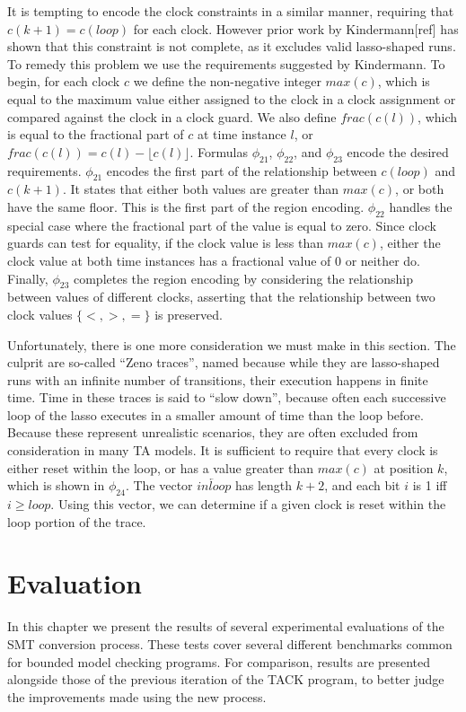 \documentclass[a4paper,12pt]{article}
\begin{document}
It is tempting to encode the clock constraints in a similar manner, requiring
that \(c(k+1) = c(loop)\) for each clock. However prior work by Kindermann[ref]
has shown that this constraint is not complete, as it excludes valid
lasso-shaped runs. To remedy this problem we use the requirements suggested by
Kindermann. To begin, for each clock \(c\) we define the non-negative integer
\(max(c)\), which is equal to the maximum value either assigned to the clock in
a clock assignment or compared against the clock in a clock guard. We also
define \(frac(c(l))\), which is equal to the fractional part of \(c\) at time
instance \(l\), or \(frac(c(l)) = c(l) - \lfloor c(l) \rfloor\). Formulas
\(\phi_{21}\), \(\phi_{22}\), and \(\phi_{23}\) encode the desired requirements.
\(\phi_{21}\) encodes the first part of the relationship between \(c(loop)\) and
\(c(k+1)\). It states that either both values are greater than \(max(c)\), or
both have the same floor. This is the first part of the region encoding.
\(\phi_{22}\) handles the special case where the fractional part of the value is
equal to zero. Since clock guards can test for equality, if the clock value is
less than \(max(c)\), either the clock value at both time instances has a
fractional value of 0 or neither do. Finally, \(\phi_{23}\) completes the region
encoding by considering the relationship between values of different clocks,
asserting that the relationship between two clock values \(\{<,>,=\}\) is
preserved.

Unfortunately, there is one more consideration we must make in this section. The
culprit are so-called ``Zeno traces'', named because while they are lasso-shaped
runs with an infinite number of transitions, their execution happens in finite
time. Time in these traces is said to ``slow down'', because often each successive
loop of the lasso executes in a smaller amount of time than the loop before.
Because these represent unrealistic scenarios, they are often excluded from
consideration in many TA models. It is sufficient to require that every clock is
either reset within the loop, or has a value greater than \(max(c)\) at position
\(k\), which is shown in \(\phi_{24}\). The vector \(\overleftarrow{inloop}\)
has length \(k+2\), and each bit \(i\) is 1 iff \(i \geq loop\). Using this
vector, we can determine if a given clock is reset within the loop portion of
the trace.


\section{Evaluation}
\label{sec:orgae69a98}
In this chapter we present the results of several experimental evaluations of
the SMT conversion process. These tests cover several different benchmarks
common for bounded model checking programs. For comparison, results are
presented alongside those of the previous iteration of the TACK program, to
better judge the improvements made using the new process.
\end{document}
